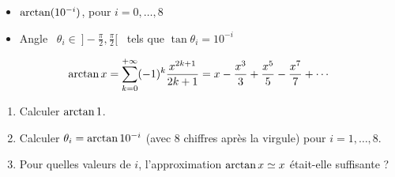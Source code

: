 \begin{frame}


\begin{itemize}
  \item $\mathop{\text{arctan}}\nolimits (10^{-i})$, pour $i=0,\ldots,8$
\pause
  \item Angle \ $\theta_i \in \ ]-\frac\pi2,\frac\pi2[$ \ tels que $\tan \theta_i = 10^{-i}$
\end{itemize}

\pause

$$\mathop{\text{arctan}}\nolimits x = \sum_{k=0}^{+\infty} (-1)^k\frac{x^{2k+1}}{2k+1} = 
x - \frac{x^3}{3}+ \frac{x^5}{5}-\frac{x^7}{7}+\cdots$$

\pause

\begin{tp}
\begin{enumerate}
  \item Calculer $\mathop{\text{arctan}}\nolimits 1$.
  \item Calculer $\theta_i = \mathop{\text{arctan}}\nolimits 10^{-i}$ (avec $8$ chiffres après la virgule) pour $i =1,\ldots,8$.
  \item Pour quelles valeurs de $i$, l'approximation $\mathop{\text{arctan}}\nolimits x \simeq x$ était-elle suffisante ?
\end{enumerate}  
\end{tp}
\end{frame}


